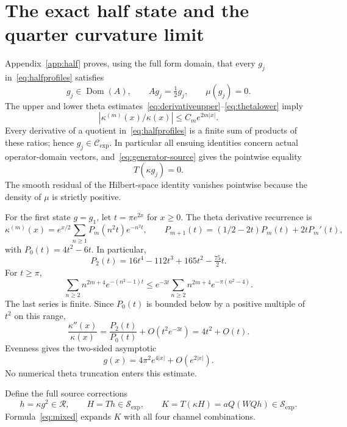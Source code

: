 \documentclass[11pt,a4paper]{article}
\numberwithin{equation}{section}
\theoremstyle{definition}
\theoremstyle{remark}
\newcommand{\dom}{\operatorname{Dom}}
\newcommand{\RR}{\mathcal R}
\newcommand{\SSS}{\mathcal S_{\!\exp}}
\newcommand{\CE}{\mathcal C_{\exp}}
\begin{document}
\section{The exact half state and the quarter curvature limit}\label{sec:curvature}

Appendix~\ref{app:half} proves, using the full form domain, that every $g_j$ in~\eqref{eq:halfprofiles} satisfies
\begin{equation}\label{eq:actualhalf}
 g_j\in\dom(A),\qquad Ag_j=\tfrac12g_j,\qquad \mu(g_j)=0.
\end{equation}
The upper and lower theta estimates~\eqref{eq:derivativeupper}--\eqref{eq:thetalower} imply
\begin{equation}\label{eq:ratio}
 |\kappa^{(m)}(x)/\kappa(x)|\le C_me^{2m|x|}.
\end{equation}
Every derivative of a quotient in~\eqref{eq:halfprofiles} is a finite sum of products of these ratios; hence $g_j\in\CE$. In particular all ensuing identities concern actual operator-domain vectors, and~\eqref{eq:generator-source} gives the pointwise equality
\begin{equation}\label{eq:halfsource}
 T(\kappa g_j)=0.
\end{equation}
The smooth residual of the Hilbert-space identity vanishes pointwise because the density of $\mu$ is strictly positive.

For the first state $g=g_1$, let $t=\pi e^{2x}$ for $x\ge0$. The theta derivative recurrence is
\begin{equation}\label{eq:recurrence}
 \kappa^{(m)}(x)=e^{x/2}\sum_{n\ge1}P_m(n^2t)e^{-n^2t},\qquad
 P_{m+1}(t)=(1/2-2t)P_m(t)+2tP_m'(t),
\end{equation}
with $P_0(t)=4t^2-6t$. In particular,
\[
 P_2(t)=16t^4-112t^3+165t^2-\tfrac{75}{2}t.
\]
For $t\ge\pi$,
\begin{equation}\label{eq:thetatail}
 \sum_{n\ge2}n^{2m+4}e^{-(n^2-1)t}
 \le e^{-3t}\sum_{n\ge2}n^{2m+4}e^{-\pi(n^2-4)}.
\end{equation}
The last series is finite. Since $P_0(t)$ is bounded below by a positive multiple of $t^2$ on this range,
\[
 \frac{\kappa''(x)}{\kappa(x)}
  =\frac{P_2(t)}{P_0(t)}+O(t^2e^{-3t})=4t^2+O(t).
\]
Evenness gives the two-sided asymptotic
\begin{equation}\label{eq:gasymptotic}
 g(x)=4\pi^2e^{4|x|}+O(e^{2|x|}).
\end{equation}
No numerical theta truncation enters this estimate.

Define the full source corrections
\begin{equation}\label{eq:HK}
 h=\kappa g^2\in\RR,\qquad H=Th\in\SSS,\qquad
 K=T(\kappa H)=aQ(WQh)\in\SSS.
\end{equation}
Formula~\eqref{eq:mixed} expands $K$ with all four channel combinations.
\end{document}
